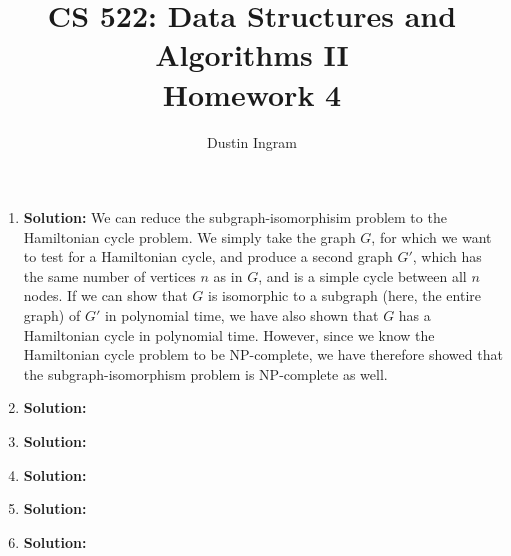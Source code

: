 \documentclass{article}
\title{CS 522: Data Structures and Algorithms II \\ Homework 4}
\author{Dustin Ingram}
\begin{document}
\maketitle
\begin{enumerate}
    \item \textbf{Solution:}
    We can reduce the subgraph-isomorphisim problem to the Hamiltonian cycle
    problem. We simply take the graph $G$, for which we want to test for a
    Hamiltonian cycle, and produce a second graph $G'$, which has the same
    number of vertices $n$ as in $G$, and is a simple cycle between all $n$
    nodes. If we can show that $G$ is isomorphic to a subgraph (here, the entire
    graph) of $G'$ in polynomial time, we have also shown that $G$ has a
    Hamiltonian cycle in polynomial time. However, since we know the Hamiltonian
    cycle problem to be NP-complete, we have therefore showed that the
    subgraph-isomorphism problem is NP-complete as well.

    \item \textbf{Solution:}
    \item \textbf{Solution:}
    \item \textbf{Solution:}
    \item \textbf{Solution:}
    \item \textbf{Solution:}
\end{enumerate}
\end{document}
